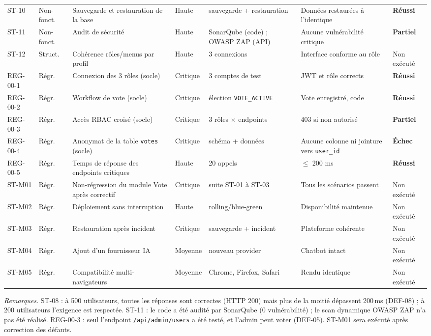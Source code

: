 \documentclass[12pt,a4paper]{report}
\newcommand{\ok}{\textcolor{okgreen}{\textbf{Réussi}}}
\newcommand{\ko}{\textcolor{kored}{\textbf{Échec}}}
\newcommand{\pa}{\textcolor{paorange}{\textbf{Partiel}}}
\newcommand{\nex}{\textcolor{negray}{Non exécuté}}
\begin{document}
\begin{longtable}{@{}p{1.45cm}p{1.25cm}p{2.9cm}p{1.15cm}p{2.3cm}p{3.4cm}p{1.6cm}@{}}
ST-10 & Non-fonct. & Sauvegarde et restauration de la base & Haute & sauvegarde + restauration & Données restaurées à l'identique & \ok\\
ST-11 & Non-fonct. & Audit de sécurité & Haute & SonarQube (code) ; OWASP ZAP (API) & Aucune vulnérabilité critique & \pa\\
ST-12 & Struct. & Cohérence rôles/menus par profil & Haute & 3 connexions & Interface conforme au rôle & \nex\\
REG-00-1 & Régr. & Connexion des 3 rôles (socle) & Critique & 3 comptes de test & JWT et rôle corrects & \ok\\
REG-00-2 & Régr. & Workflow de vote (socle) & Critique & élection \texttt{VOTE\_ACTIVE} & Vote enregistré, code & \ok\\
REG-00-3 & Régr. & Accès RBAC croisé (socle) & Critique & 3 rôles $\times$ endpoints & 403 si non autorisé & \pa\\
REG-00-4 & Régr. & Anonymat de la table \texttt{votes} (socle) & Critique & schéma + données & Aucune colonne ni jointure vers \texttt{user\_id} & \ko\\
REG-00-5 & Régr. & Temps de réponse des endpoints critiques & Haute & 20 appels & $\leq$ 200 ms & \ok\\
ST-M01 & Régr. & Non-régression du module Vote après correctif & Critique & suite ST-01 à ST-03 & Tous les scénarios passent & \nex\\
ST-M02 & Régr. & Déploiement sans interruption & Haute & rolling/blue-green & Disponibilité maintenue & \nex\\
ST-M03 & Régr. & Restauration après incident & Critique & sauvegarde + incident & Plateforme cohérente & \nex\\
ST-M04 & Régr. & Ajout d'un fournisseur IA & Moyenne & nouveau provider & Chatbot intact & \nex\\
ST-M05 & Régr. & Compatibilité multi-navigateurs & Moyenne & Chrome, Firefox, Safari & Rendu identique & \nex\\
\end{longtable}

\textit{Remarques.} ST-08 : à 500 utilisateurs, toutes les réponses sont correctes (HTTP 200) mais plus de la moitié dépassent 200\,ms (DEF-08) ; à 200 utilisateurs l'exigence est respectée. ST-11 : le code a été audité par SonarQube (0 vulnérabilité) ; le scan dynamique OWASP ZAP n'a pas été réalisé. REG-00-3 : seul l'endpoint \texttt{/api/admin/users} a été testé, et l'admin peut voter (DEF-05). ST-M01 sera exécuté après correction des défauts.
\end{document}
